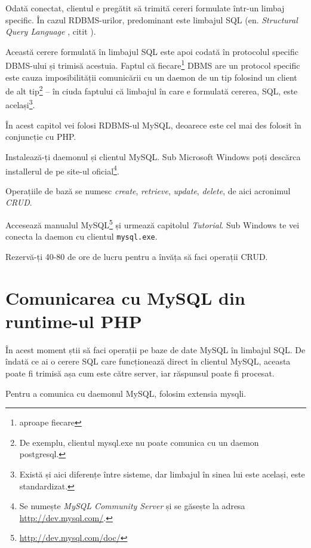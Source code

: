 Odată conectat, clientul e pregătit să trimită cereri formulate
într-un limbaj specific. În cazul RDBMS-urilor, predominant este
limbajul SQL (en. \textsl{Structural Query Language}
, citit \texttt{}).%

Această cerere formulată în limbajul SQL este apoi codată în
protocolul specific DBMS-ului și trimisă acestuia.
Faptul că fiecare\footnote{aproape fiecare} DBMS are un protocol
specific este cauza imposibilității comunicării cu un daemon
de un tip folosind un client de alt tip\footnote{De exemplu,
clientul mysql.exe nu poate comunica cu un daemon postgresql.}
-- în ciuda faptului că limbajul în care e formulată cererea, SQL,
este același\footnote{Există și aici diferențe între sisteme,
dar limbajul în sinea lui este același, este standardizat.}.

În acest capitol vei folosi RDBMS-ul MySQL, deoarece este
cel mai des folosit în conjuncție cu PHP.

\begin{Exercise}[title={Primii pași în baze de date}]
\ExePart

Instalează-ți daemonul și clientul MySQL. Sub Microsoft
Windows poți descărca installerul de pe site-ul
oficial\footnote{Se numește \textit{MySQL Community Server} și se găsește
la adresa \url{http://dev.mysql.com/}.}.

\ExePart

Operațiile de bază se numesc \textit{create}, \textit{retrieve},
\textit{update}, \textit{delete}, de aici acronimul \textsl{CRUD}.

Accesează manualul MySQL\footnote{\url{http://dev.mysql.com/doc/}}
și urmează capitolul \textit{Tutorial}. Sub Windows te vei conecta la daemon
cu clientul \texttt{mysql.exe}.

Rezervă-ți 40-80 de ore de lucru pentru a învăța să faci operații CRUD.
\end{Exercise}

\section{Comunicarea cu MySQL din runtime-ul PHP}
În acest moment știi să faci operații pe baze de date MySQL în limbajul SQL.
De îndată ce ai o cerere SQL care funcționează direct în clientul MySQL,
aceasta poate fi trimisă așa cum este către server, iar răspunsul poate fi
procesat.

Pentru a comunica cu daemonul MySQL, folosim extensia mysqli.


